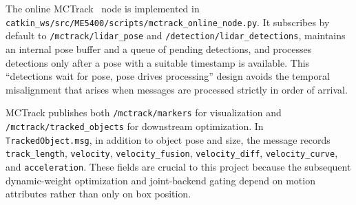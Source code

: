 \documentclass[a4paper,12pt]{article}
\newcommand{\code}[1]{\nolinkurl{#1}}
\begin{document}
The online MCTrack~\cite{mctrack} node is implemented in \code{catkin_ws/src/ME5400/scripts/mctrack_online_node.py}. It subscribes by default to \code{/mctrack/lidar_pose} and \code{/detection/lidar_detections}, maintains an internal pose buffer and a queue of pending detections, and processes detections only after a pose with a suitable timestamp is available. This ``detections wait for pose, pose drives processing'' design avoids the temporal misalignment that arises when messages are processed strictly in order of arrival.

MCTrack publishes both \code{/mctrack/markers} for visualization and \code{/mctrack/tracked_objects} for downstream optimization. In \code{TrackedObject.msg}, in addition to object pose and size, the message records \code{track_length}, \code{velocity}, \code{velocity_fusion}, \code{velocity_diff}, \code{velocity_curve}, and \code{acceleration}. These fields are crucial to this project because the subsequent dynamic-weight optimization and joint-backend gating depend on motion attributes rather than only on box position.
\end{document}
